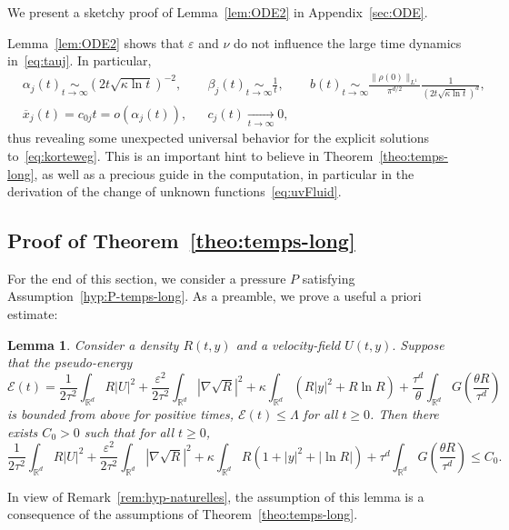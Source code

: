 \documentclass[10pt]{amsart}
\newtheorem{lemm}[theo]{Lemma}\newtheorem{prop}[theo]{Proposition}\newtheorem{coro}[theo]{Corollary}\newtheorem{conj}[theo]{Conjecture}
\theoremstyle{definition}\newtheorem{defi}[theo]{Definition}\newtheorem{rema}[theo]{Remark}\newtheorem{exam}[theo]{Example}\newtheorem{exem}[theo]{Example}\newtheorem{nota}[theo]{Notation}
\newcommand*\R{\mathbb{R}}
\newcommand*\<{\left\langle}
\renewcommand*\>{\right\rangle}
\renewcommand*\le{\leqslant}
\renewcommand*\ge{\geqslant}
\newcommand*\Eq[2]{\mathop{\sim}\limits_{#1\rightarrow#2}}
\newcommand*\Tend[2]{\mathop{\longrightarrow}\limits_{#1\rightarrow#2}}
\newcommand*\eps{\varepsilon}
\begin{document}
We present a sketchy proof of Lemma~\ref{lem:ODE2} in Appendix~\ref{sec:ODE}.

Lemma~\ref{lem:ODE2} shows that $\eps$ and $\nu$ do not influence the large time dynamics in~\eqref{eq:tauj}. In particular,
\[
\begin{aligned}
&\alpha_j(t)\Eq t \infty \left(2t\sqrt{\kappa \ln t}\right)^{-2},&&
\beta_j(t)\Eq t \infty \frac{1}{t}, && b(t)\Eq t \infty \frac{\|\rho(0)\|_{L^1}}{\pi^{d/2}}\frac{1}{(2t\sqrt{\kappa \ln t})^{d}},\\
& \overline x_j(t)=c_{0j}t=o\left(\alpha_j(t)\right),&& c_j(t)\Tend t \infty 0,
\end{aligned}
\]
thus revealing some unexpected universal behavior for the explicit solutions to~\eqref{eq:korteweg}. This is an important hint to believe in Theorem~\ref{theo:temps-long}, as well as a precious guide in the computation, in particular in the derivation of the change of unknown functions~\eqref{eq:uvFluid}.


\subsection{Proof of Theorem~\ref{theo:temps-long}}\label{sec:convergence}

For the end of this section, we consider a pressure $P$ satisfying Assumption~\ref{hyp:P-temps-long}. As a preamble, we prove a useful a priori estimate:

\begin{lemm}\label{lem:aprioriE}
Consider a density $R(t,y)$ and a velocity-field $U(t,y).$ Suppose that the pseudo-energy
\begin{equation*}
\mathcal E(t) = \frac{1}{2\tau^2}\int_{\R^d} R|U|^2+\frac{\eps^2}{2\tau^2} \int_{\R^d}|\nabla \sqrt R|^2 +\kappa\int_{\R^d} (R|y|^2 + R \ln R) +
\frac{\tau^d}{\theta}\int_{\R^d} G\left(\frac{ \theta R}{\tau^d}\right)
\end{equation*}
is bounded from above for positive times, $\mathcal E(t)\le
\Lambda$ for all $t\ge 0$. Then there exists $C_0>0$ such that for all $t\ge 0$,
\begin{equation*}
\frac{1}{2\tau^2}\int_{\R^d} R|U|^2 +\frac{\eps^2}{2\tau^2} \int_{\R^d}|\nabla \sqrt R|^2 + \kappa \int_{\R^d} R (1+|y|^2 + |\ln R|) +
\tau^d\int_{\R^d} G\left(\frac{ \theta R}{\tau^d}\right)
\le C_0.
\end{equation*}
\end{lemm}

In view of Remark~\ref{rem:hyp-naturelles}, the assumption of this lemma is a consequence of the assumptions of Theorem~\ref{theo:temps-long}.
\end{document}
